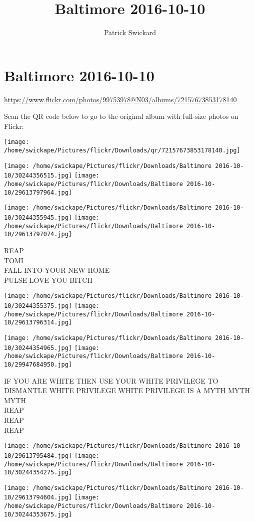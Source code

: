 \documentclass[10pt,letterpaper]{article}
\title{Baltimore 2016-10-10}
\author{Patrick Swickard}
\date{}
\begin{document}
\section*{Baltimore 2016-10-10}

\url{https://www.flickr.com/photos/99753978@N03/albums/72157673853178140}

Scan the QR code below to go to the original album with full-size photos on Flickr:

\texttt{[image: /home/swickape/Pictures/flickr/Downloads/qr/72157673853178140.jpg]}
\pagebreak

\texttt{[image: /home/swickape/Pictures/flickr/Downloads/Baltimore 2016-10-10/30244356515.jpg]}
\texttt{[image: /home/swickape/Pictures/flickr/Downloads/Baltimore 2016-10-10/29613797964.jpg]}

\texttt{[image: /home/swickape/Pictures/flickr/Downloads/Baltimore 2016-10-10/30244355945.jpg]}
\texttt{[image: /home/swickape/Pictures/flickr/Downloads/Baltimore 2016-10-10/29613797074.jpg]}

REAP\\
TOMI\\
FALL INTO YOUR NEW HOME\\
PULSE LOVE YOU BITCH
\pagebreak

\texttt{[image: /home/swickape/Pictures/flickr/Downloads/Baltimore 2016-10-10/30244355375.jpg]}
\texttt{[image: /home/swickape/Pictures/flickr/Downloads/Baltimore 2016-10-10/29613796314.jpg]}

\texttt{[image: /home/swickape/Pictures/flickr/Downloads/Baltimore 2016-10-10/30244354965.jpg]}
\texttt{[image: /home/swickape/Pictures/flickr/Downloads/Baltimore 2016-10-10/29947684950.jpg]}

IF YOU ARE WHITE THEN USE YOUR WHITE PRIVILEGE TO DISMANTLE WHITE PRIVILEGE WHITE PRIVILEGE IS A MYTH MYTH MYTH\\
REAP\\
REAP\\
REAP
\pagebreak

\texttt{[image: /home/swickape/Pictures/flickr/Downloads/Baltimore 2016-10-10/29613795484.jpg]}
\texttt{[image: /home/swickape/Pictures/flickr/Downloads/Baltimore 2016-10-10/30244354275.jpg]}

\texttt{[image: /home/swickape/Pictures/flickr/Downloads/Baltimore 2016-10-10/29613794604.jpg]}
\texttt{[image: /home/swickape/Pictures/flickr/Downloads/Baltimore 2016-10-10/30244353675.jpg]}
\end{document}
